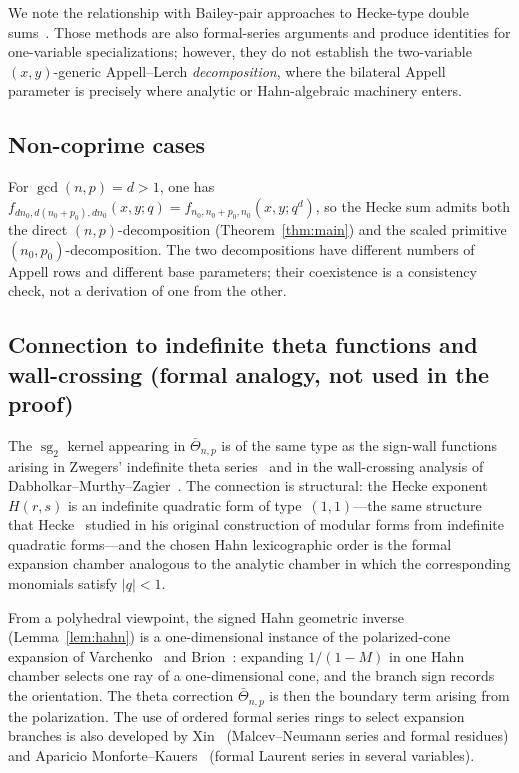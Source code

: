 \documentclass[11pt]{article}
\newcommand{\sgtwo}{\operatorname{sg}_2}
\begin{document}
We note the relationship with Bailey-pair approaches to Hecke-type
double sums~\cite{jAn01,jLO13}.  Those methods are also
formal-series arguments and produce identities for one-variable
specializations; however, they do not establish the two-variable
$(x,y)$-generic Appell--Lerch \emph{decomposition}, where the
bilateral Appell parameter is precisely where analytic or Hahn-algebraic
machinery enters.

\subsection*{Non-coprime cases}

For $\gcd(n,p)=d>1$, one has
$f_{dn_0,d(n_0+p_0),dn_0}(x,y;q)=f_{n_0,n_0+p_0,n_0}(x,y;q^d)$,
so the Hecke sum admits both the direct $(n,p)$-decomposition
(Theorem~\ref{thm:main}) and the scaled primitive
$(n_0,p_0)$-decomposition.  The two decompositions have different
numbers of Appell rows and different base parameters; their
coexistence is a consistency check, not a derivation of one
from the other.

\subsection*{Connection to indefinite theta functions and wall-crossing
  (formal analogy, not used in the proof)}

The $\sgtwo$ kernel appearing in $\bar\Theta_{n,p}$ is of the
same type as the sign-wall functions arising in Zwegers'
indefinite theta series~\cite{oZw02} and in the wall-crossing
analysis of Dabholkar--Murthy--Zagier~\cite{jDMZ14}.
The connection is structural: the Hecke exponent $H(r,s)$
is an indefinite quadratic form of type~$(1,1)$---the same
structure that Hecke~\cite{oHe25} studied in his original
construction of modular forms from indefinite quadratic
forms---and the chosen Hahn lexicographic order is the
formal expansion chamber analogous to the analytic chamber
in which the corresponding monomials satisfy $|q|<1$.

From a polyhedral viewpoint, the signed Hahn geometric inverse
(Lemma~\ref{lem:hahn}) is a one-dimen\-sional instance of the
polarized-cone expansion of
Varchenko~\cite{jVa87} and Brion~\cite{jBr88}: expanding
$1/(1-M)$ in one Hahn chamber selects one ray of a
one-dimensional cone, and the branch sign records the
orientation.  The theta correction $\bar\Theta_{n,p}$ is then
the boundary term arising from the polarization.  The use of
ordered formal series rings to select expansion branches is
also developed by Xin~\cite{jXi05} (Malcev--Neumann series
and formal residues) and Aparicio
Monforte--Kauers~\cite{jAMK13} (formal Laurent series in
several variables).
\end{document}
